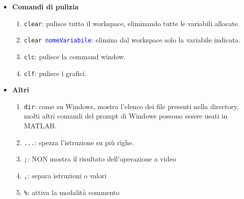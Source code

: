 \begin{itemize}
    \item    \textbf{Comandi di pulizia}\\
            \begin{enumerate}
                \item \texttt{clear}: pulisce tutto il workspace, eliminando tutte le variabili allocate.
                \item \texttt{clear \textcolor{blue}{nomeVariabile}}: elimina dal workspace solo la variabile indicata.
                \item \texttt{clc}: pulisce la command window.
                \item \texttt{clf}: pulisce i grafici.
            \end{enumerate}
        
    \item   \textbf{Altri }  \\
            \begin{enumerate}
                \item \texttt{dir}: come su Windows, mostra l'elenco dei file presenti nella directory, molti altri 
                comandi del prompt di Windows possono essere usati in MATLAB.
                \item \texttt{...}: spezza l'istruzione su più righe.
                \item \texttt{;}: NON mostra il risultato dell'operazione a video
                \item \texttt{,}: separa istruzioni o valori
                \item \texttt{\%}: attiva la modalità commento
            \end{enumerate}
\end{itemize}